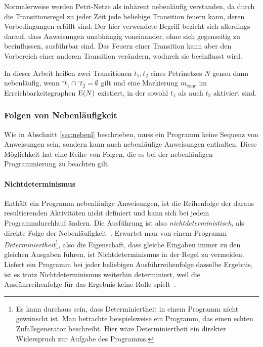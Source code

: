 Normalerweise werden Petri-Netze  als inhärent nebenläufig verstanden, da durch die Transitionsregel zu jeder Zeit jede beliebige Transition feuern kann, deren Vorbedingungen  erfüllt sind. Der hier verwendete Begriff bezieht sich allerdings darauf, dass Anweisungen unabhängig voneinander, ohne sich gegenseitig zu beeinflussen, ausführbar sind. Das Feuern einer Transition kann aber den Vorbereich einer anderen Transition verändern, wodurch sie beeinflusst wird.

In dieser Arbeit heißen zwei Transitionen $t_1, t_2$ eines Petrinetzes $N$ genau dann nebenläufig, wenn ${}^\circ t_1 \cap {}^\circ t_2 = \emptyset$ gilt und eine Markierung $m_\text{conc}$ im Erreichbarkeitsgraphen $\operatorname{E}(N)$ existiert, in der sowohl $t_1$ als auch $t_2$ aktiviert sind.

\subsubsection{Folgen von Nebenläufigkeit}\label{sec:nebenl-folgen}
Wie in Abschnitt \ref{sec:nebenl} beschrieben, muss ein Programm keine Sequenz von Anweisungen sein, sondern kann auch nebenläufige Anweisungen enthalten. Diese Möglichkeit hat eine Reihe von Folgen, die es bei der nebenläufigen Programmierung zu beachten gilt.
\paragraph{Nichtdeterminismus}
Enthält ein Programm nebenläufige Anweisungen, ist die Reihenfolge der daraus resultierenden Aktivitäten nicht definiert und kann sich bei jedem Programmdurchlauf ändern. Die Ausführung ist also \emph{nichtdeterministisch}, als direkte Folge der Nebenläufigkeit~\cite[S.~17~f.]{Herrtwich1989}. Erwartet man von einem Programm \emph{Determiniertheit}\footnote{Es kann durchaus sein, dass Determiniertheit in einem Programm nicht gewünscht ist. Man betrachte beispielsweise ein Programm, das einen echten Zufallsgenerator beschreibt. Hier wäre Determiniertheit ein direkter Widerspruch zur Aufgabe des Programms.}, also die Eigenschaft, dass gleiche Eingaben immer zu den gleichen Ausgaben führen, ist Nichtdeterminismus in der Regel zu vermeiden. Liefert ein Programm bei jeder beliebigen Ausführreihenfolge dasselbe Ergebnis, ist es trotz Nichtdeterminismus weiterhin determiniert, weil die Ausführreihenfolge für das Ergebnis keine Rolle spielt~\cite[S.~18~f.]{Herrtwich1989}. 

